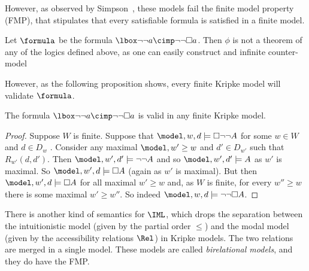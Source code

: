 However, as observed by Simpson~\cite{simpson1994}, these models fail the finite model property (FMP), that stipulates that every satisfiable 
formula is satisfied in a finite model.

\begin{example}\label{exa:form}
  Let $\formula$ be the formula $\lbox\neg\neg a \cimp \neg\neg \Box
  a$. Then $\phi$ is not a theorem of any of the logics defined above,
  as one can easily construct and infinite counter-model 

  However, as the following proposition shows, every finite Kripke model will validate $\formula$.
\end{example}


\begin{proposition}
The formula $\lbox\neg\neg a \cimp \neg\neg \Box
  a$ is valid in any finite Kripke model. 
\end{proposition}

\begin{proof}
  Suppose $W$ is finite. Suppose that
  $\model, w, d \models \Box \neg \neg A$ for some $w \in W$ and
  $d \in D_w$ . Consider any maximal $\model, w' \ge w$ and
  $d' \in D_{w'}$ such that $R_{w'} (d, d')$. Then
  $\model, w', d' \models \neg\neg A$ and so
  $\model, w', d' \models A$ as $w'$ is maximal. So
  $\model, w', d \models \Box A$ (again as $w'$ is maximal). But then
  $\model, w', d \models \Box A$ for all maximal $w' \ge w$ and, as $W$ is
  finite, for every $w'' \ge w$ there is some maximal $w' \ge w''$. So
  indeed $\model, w, d \models \neg \neg \Box A$.
\end{proof}

There is another kind of semantics for $\IML$, which drops the separation between the intuitionistic model (given by the partial order $\le$) and the modal model (given by the accessibility relations $\Rel$) in Kripke models. The two relations are merged in a single model. These models are called \emph{birelational models}, and they do have the FMP.


